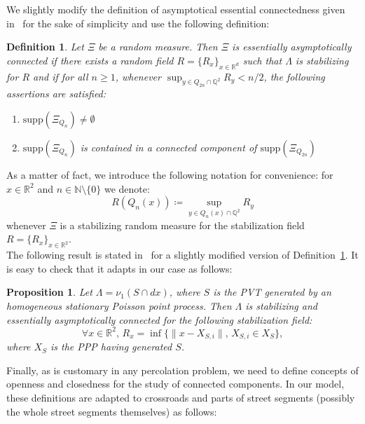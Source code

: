 \documentclass[10pt,a4paper]{amsart}
\theoremstyle{exampstyle}
\newtheorem{Definition}{Definition}
\newtheorem{Proposition}{Proposition}
\theoremstyle{exampnotations}
\begin{document}
\indent We slightly modify the definition of asymptotical essential connectedness given in~\cite{hirsch2018continuum} for the sake of simplicity and use the following definition:
\begin{Definition} %
\label{Def.eac}
Let $\Xi$ be a random measure. Then $\Xi$ is \emph{essentially asymptotically connected} if there exists a random field $R = \lbrace R_{x} \rbrace_{x \in \mathbb{R}^{d}}$ such that $\Lambda$ is stabilizing for $R$ and if for all $n \geq 1$, whenever $\displaystyle \sup_{y \in Q_{2n} \cap \mathbb{Q}^{2}} R_{y} < n/2$, the following assertions are satisfied:
\begin{enumerate}[label = (\arabic*)]
\item $\text{supp}(\Xi_{Q_{n}}) \neq \emptyset$
\item $\text{supp}(\Xi_{Q_{n}})$ is contained in a connected component of $\text{supp}(\Xi_{Q_{2n}})$
\end{enumerate}
\end{Definition}

As a matter of fact, we introduce the following notation for convenience: for $x \in \mathbb{R}^{2}$ and $n \in \mathbb{N}\setminus \lbrace 0 \rbrace$ we denote:
$$R(Q_n(x)) \coloneqq \sup_{y \in Q_n(x) \cap \mathbb{Q}^{2}} R_y$$
whenever $\Xi$ is a stabilizing random measure for the stabilization field $R = \lbrace R_x \rbrace _{x \in \mathbb{R}^{2}}$. \\

The following result is stated in~\cite[Example 3.1]{hirsch2018continuum} for a slightly modified version of Definition~\ref{Def.eac}. It is easy to check that it adapts in our case as follows:

\begin{Proposition}
Let $\Lambda = \nu_{1}(S \cap dx)$, where $S$ is the PVT generated by an homogeneous stationary Poisson point process. Then $\Lambda$ is stabilizing and essentially asymptotically connected for the following stabilization field:
$$\forall x \in \mathbb{R}^{2}, \, R_x = \inf \lbrace \lVert x - X_{S,i} \rVert , \, X_{S,i} \in X_{S} \rbrace,$$
where $X_S$ is the PPP having generated $S$.
\end{Proposition}




\indent Finally, as is customary in any percolation problem, we need to define concepts of openness and closedness for the study of connected components. In our model, these definitions are adapted to crossroads and parts of street segments (possibly the whole street segments themselves) as follows:
\end{document}
